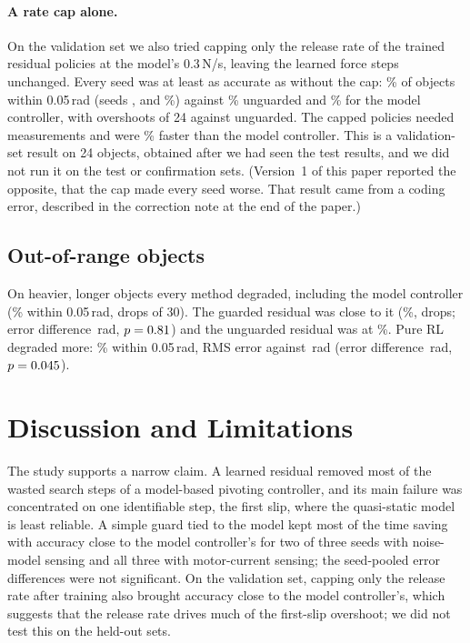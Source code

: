 \documentclass[11pt]{article}
\begin{document}
\paragraph{A rate cap alone.} On the validation set we also tried capping only the release rate of the trained residual policies at the model's 0.3\,N/s, leaving the learned force steps unchanged. Every seed was at least as accurate as without the cap: \VResRFive\% of objects within 0.05\,rad (seeds \VResRFivea, \VResRFiveb{} and \VResRFivec\%) against \VResFive\% unguarded and \VModFive\% for the model controller, with \VResROver{} overshoots of 24 against \VResOver{} unguarded. The capped policies needed \VResRProbes{} measurements and were \VResRTimeCut\% faster than the model controller. This is a validation-set result on 24 objects, obtained after we had seen the test results, and we did not run it on the test or confirmation sets. (Version~1 of this paper reported the opposite, that the cap made every seed worse. That result came from a coding error, described in the correction note at the end of the paper.)

\subsection{Out-of-range objects}
On heavier, longer objects every method degraded, including the model controller (\OModFive\% within 0.05\,rad, \OModDrops{} drops of 30). The guarded residual was close to it (\OResGFive\%, \OResGDrops{} drops; error difference \OResGdE{}\,rad, $p=0.81$) and the unguarded residual was at \OResFive\%. Pure RL degraded more: \OPurFive\% within 0.05\,rad, RMS error \OPurRms{} against \OModRms\,rad (error difference \OPurdE{}\,rad, $p=0.045$).

\section{Discussion and Limitations}
The study supports a narrow claim. A learned residual removed most of the wasted search steps of a model-based pivoting controller, and its main failure was concentrated on one identifiable step, the first slip, where the quasi-static model is least reliable. A simple guard tied to the model kept most of the time saving with accuracy close to the model controller's for two of three seeds with noise-model sensing and all three with motor-current sensing; the seed-pooled error differences were not significant. On the validation set, capping only the release rate after training also brought accuracy close to the model controller's, which suggests that the release rate drives much of the first-slip overshoot; we did not test this on the held-out sets.
\end{document}

